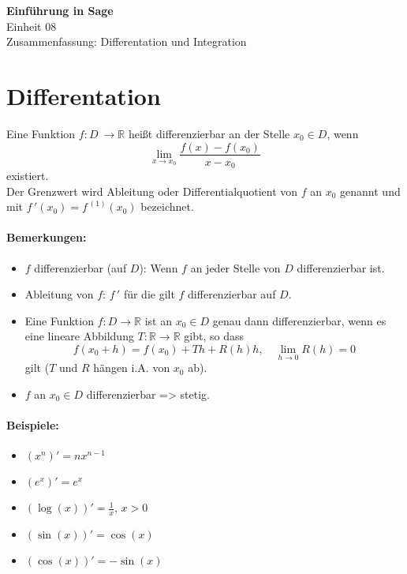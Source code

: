 \documentclass[a4paper,12pt,DIV15]{scrartcl}
\begin{document}
\begin{center}
    \textbf{\LARGE Einführung in Sage}\\
    {\large Einheit 08}\\
    {\large Zusammenfassung: Differentation und Integration}
\end{center}

\section{Differentation}
\begin{defn}[Ableitung]
Eine Funktion $f: D \ \rightarrow \mathbb{R}$ heißt {\color{red}  differenzierbar} an
der Stelle $x_0 \in D$, wenn 
\[ \lim_{x \rightarrow x_0} \frac{f(x)-f(x_0)}{x -x_0} \]
existiert. \\
Der Grenzwert wird {\color{red} Ableitung} oder {\color{red} Differentialquotient}
von $f$ an $x_0$ genannt und mit $f\,'(x_0)=f^{\,(1)} (x_0)$ bezeichnet.
\end{defn}


\paragraph{Bemerkungen:}
\begin{itemize}
\item $f$ {\color{red} differenzierbar} (auf $D$): Wenn $f$ an jeder
Stelle von $D$ differenzierbar ist. 
\item {\color{red} Ableitung} von $f$: $f\,'$ für die gilt $f$ differenzierbar auf $D$.
\item Eine Funktion $f:D \rightarrow \mathbb{R}$ ist an $x_0 \in D$
genau dann differenzierbar, wenn es eine lineare Abbildung
$T:\mathbb{R} \rightarrow \mathbb{R}$ gibt, so dass 
\[ f(x_0+h)=f(x_0) +Th + R(h)h, \quad \lim_{h \rightarrow 0} R(h)=0 \]
gilt ($T$ und $R$ hängen i.A. von $x_0$ ab). 
\item $f$ an $x_0 \in D$ differenzierbar => stetig.
\end{itemize}

\paragraph{Beispiele:}
\begin{itemize}
\item $(x^n)'=n x^{n-1}$
\item $(e^x)'=e^x$
\item $(\log(x))'= \frac{1}{x}$, $x>0$
\item $(\sin(x))'=\cos(x)$
\item $(\cos(x))'=-\sin(x)$
\end{itemize}
\end{document}
